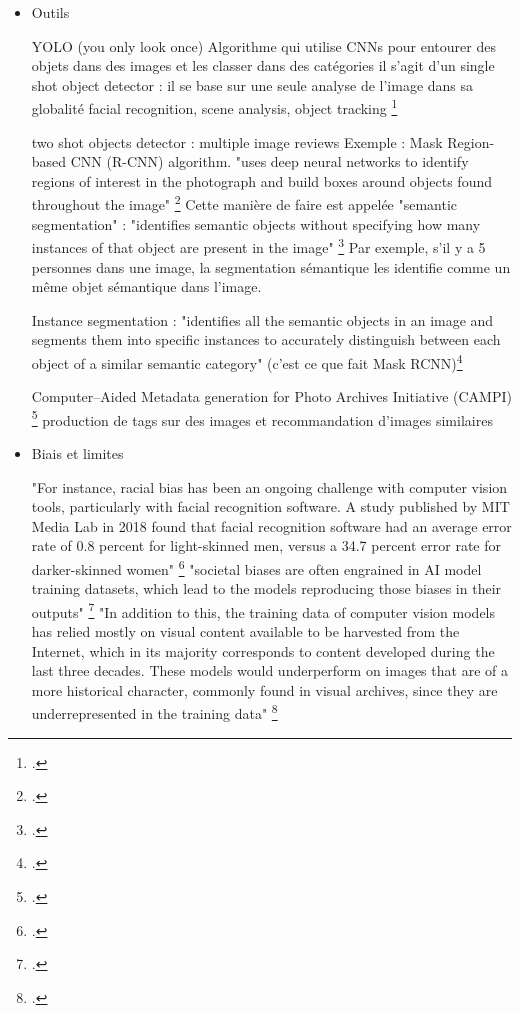 \begin{itemize}
	"When it comes to processing
	image-based records in archives archives, supervised learning models can be	helpful for identification and classification, while unsupervised learning	models are best suited for processing large amounts of data for creating	generic descriptions, and highlighting possible connections between records."
	\footcite{fewster}
	
	\item Outils 
	
	YOLO (you only look once)
	Algorithme qui utilise CNNs pour entourer des objets dans des images et les classer dans des catégories 
	il s'agit d'un single shot object detector : il se base sur une seule analyse de l'image dans sa globalité 
	facial recognition, scene analysis, object tracking \footcite{fewster}
	
	two shot objects detector : multiple image reviews 
	Exemple : Mask	Region-based CNN (R-CNN) algorithm. "uses deep neural networks to	identify regions of interest in the photograph and build boxes around objects	found throughout the image" \footcite{fewster}
	Cette manière de faire est appelée "semantic segmentation" : "identifies semantic objects	without specifying how many instances of that object are present in the	image" \footcite{fewster}
	Par exemple, s'il y a 5 personnes dans une image, la segmentation sémantique les identifie comme un même objet sémantique dans l'image.
	
	Instance segmentation : "identifies all the semantic objects in	an image and segments them into specific instances to accurately distinguish	between each object of a similar semantic category" (c'est ce que fait Mask RCNN)\footcite{fewster}
	
	Computer–Aided Metadata generation for Photo Archives Initiative (CAMPI) \footcite{fewster} production de tags sur des images et recommandation d'images similaires 
	
	
	\item Biais et limites 
	
	"For instance, racial bias has been an ongoing challenge with	computer vision tools, particularly with facial recognition software. A study	published by MIT Media Lab in 2018 found that facial recognition software	had an average error rate of 0.8 percent for light-skinned men, versus a 34.7 percent	error rate for darker-skinned women" \footcite{fewster}
	"societal biases are often engrained in	AI model training datasets, which lead to the models reproducing those	biases in their outputs" \footcite{fewster}
	"In addition to this, the training data of computer	vision models has relied mostly on visual content available to be harvested	from the Internet, which in its majority corresponds to content developed	during the last three decades. These models would underperform on images	that are of a more historical character, commonly found in visual archives,	since they are underrepresented in the training data" \footcite{fewster}
	

\end{itemize}
